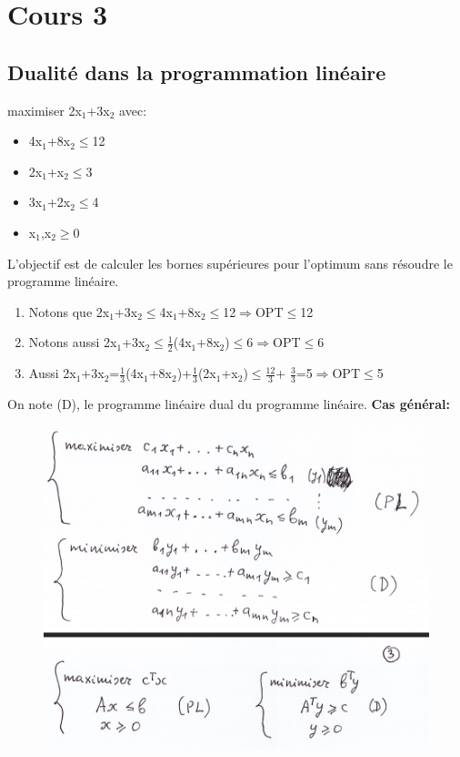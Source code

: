 \section{Cours 3}
\subsection{Dualité dans la programmation linéaire}
maximiser 2x$_1$+3x$_2$ avec:
\begin{itemize}
	\item 4x$_1$+8x$_2\leq$12
	\item 2x$_1$+x$_2\leq$3
	\item 3x$_1$+2x$_2\leq$4
	\item x$_1$,x$_2\geq$0
\end{itemize}
L'objectif est de calculer les bornes supérieures pour l'optimum sans résoudre le programme linéaire.
\begin{enumerate}
	\item Notons que 2x$_1$+3x$_2\leq$4x$_1$+8x$_2\leq$12$\Rightarrow$OPT$\leq$12
	\item Notons aussi 2x$_1$+3x$_2\leq\frac{1}{2}$(4x$_1$+8x$_2$)$\leq$6$\Rightarrow$OPT$\leq$6
	\item Aussi 2x$_1$+3x$_2$=$\frac{1}{3}$(4x$_1$+8x$_2$)+$\frac{1}{3}$(2x$_1$+x$_2$)$\leq\frac{12}{3}$+
	$\frac{3}{3}$=5$\Rightarrow$OPT$\leq$5
\end{enumerate}
On note (D), le programme linéaire dual du programme linéaire.
\newpage
\textbf{Cas général:}
\begin{figure}[h!]
\includegraphics[width=\linewidth,height=0.75\textheight]{notes/algorithme/cas_general_dualite.png}
\end{figure}

